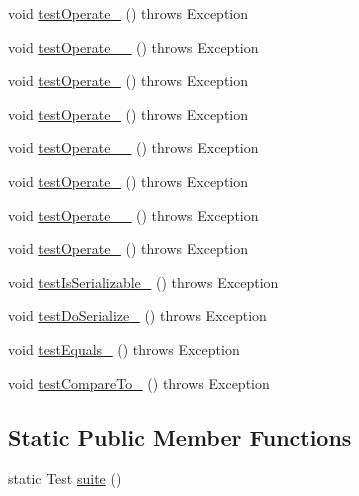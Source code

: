 \begin{DoxyCompactItemize}
void \hyperlink{classorg_1_1jgap_1_1impl_1_1_two_way_mutation_operator_test_a7db4bcc04b20603ce74a442945cc4189}{test\-Operate\-\_} ()  throws Exception 
\item 
void \hyperlink{classorg_1_1jgap_1_1impl_1_1_two_way_mutation_operator_test_a33dc84e10064aa3f546d39f1df943bcc}{test\-Operate\-\_\-\_} ()  throws Exception 
\item 
void \hyperlink{classorg_1_1jgap_1_1impl_1_1_two_way_mutation_operator_test_ae3373c063cd72f1ba17b2c98d0db33b1}{test\-Operate\-\_} ()  throws Exception 
\item 
void \hyperlink{classorg_1_1jgap_1_1impl_1_1_two_way_mutation_operator_test_a60231c860d1fe97ef3099f755a9b5a0c}{test\-Operate\-\_} ()  throws Exception 
\item 
void \hyperlink{classorg_1_1jgap_1_1impl_1_1_two_way_mutation_operator_test_ad5e7a0c1980806808308431a03ead4af}{test\-Operate\-\_\-\_} ()  throws Exception 
\item 
void \hyperlink{classorg_1_1jgap_1_1impl_1_1_two_way_mutation_operator_test_a5b9af4fc46f95af9b923d6b0b9f65d3a}{test\-Operate\-\_} ()  throws Exception 
\item 
void \hyperlink{classorg_1_1jgap_1_1impl_1_1_two_way_mutation_operator_test_a811f359c1815b31efa93a006b9fb31f0}{test\-Operate\-\_\-\_} ()  throws Exception 
\item 
void \hyperlink{classorg_1_1jgap_1_1impl_1_1_two_way_mutation_operator_test_a3ee4f4d7d87956b8242bad4d2f185718}{test\-Operate\-\_} ()  throws Exception 
\item 
void \hyperlink{classorg_1_1jgap_1_1impl_1_1_two_way_mutation_operator_test_a1d39352ae6f5842dbd8507d5a7770cd8}{test\-Is\-Serializable\-\_} ()  throws Exception 
\item 
void \hyperlink{classorg_1_1jgap_1_1impl_1_1_two_way_mutation_operator_test_a9afdce817ce9995938f7ad6b0158cdad}{test\-Do\-Serialize\-\_} ()  throws Exception 
\item 
void \hyperlink{classorg_1_1jgap_1_1impl_1_1_two_way_mutation_operator_test_a424ae5203191621fde09ebd7e49f5a38}{test\-Equals\-\_} ()  throws Exception 
\item 
void \hyperlink{classorg_1_1jgap_1_1impl_1_1_two_way_mutation_operator_test_a6c25d8783e8d7adb703d7e7e92b0c0aa}{test\-Compare\-To\-\_} ()  throws Exception 
\end{DoxyCompactItemize}
\subsection*{Static Public Member Functions}
\begin{DoxyCompactItemize}
\item 
static Test \hyperlink{classorg_1_1jgap_1_1impl_1_1_two_way_mutation_operator_test_acb671a73091f904ba404f4a8341ee7c1}{suite} ()
\end{DoxyCompactItemize}
